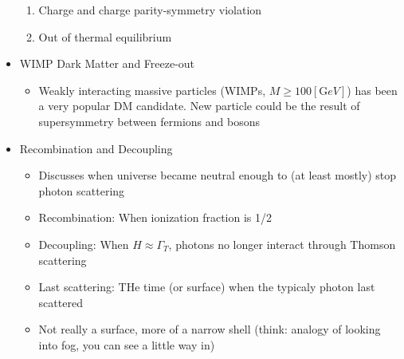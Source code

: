\begin{itemize}
\begin{enumerate}
      \item Charge and charge parity-symmetry violation

      \item Out of thermal equilibrium

    \end{enumerate}

  \item WIMP Dark Matter and Freeze-out

    \begin{itemize}

      \item Weakly interacting massive particles (WIMPs, $M\geq 100[\si{\giga eV}]$) has been a very popular DM candidate. New particle could be the result of supersymmetry between fermions and bosons

    \end{itemize}

  \item Recombination and Decoupling

    \begin{itemize}

      \item Discusses when universe became neutral enough to (at least mostly) stop photon scattering

      \item Recombination: When ionization fraction is 1/2

      \item Decoupling: When $H\approx\Gamma_T$, photons no longer interact through Thomson scattering

      \item Last scattering: THe time (or surface) when the typicaly photon last scattered

      \item Not really a surface, more of a narrow shell (think: analogy of looking into fog, you can see a little way in)

    \end{itemize}

\end{itemize}



